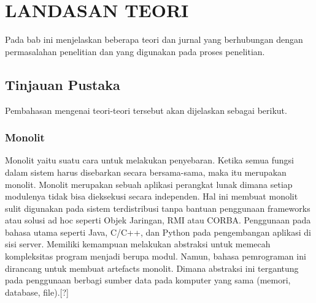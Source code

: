 \chapter{LANDASAN TEORI}
\vspace{4.5pt}
Pada bab ini menjelaskan beberapa teori dan jurnal yang berhubungan dengan permasalahan penelitian dan yang digunakan pada proses penelitian.
\section{Tinjauan Pustaka}
Pembahasan mengenai teori-teori tersebut akan dijelaskan sebagai berikut.
\subsection{Monolit}
Monolit yaitu suatu cara untuk melakukan penyebaran. Ketika semua fungsi dalam sistem harus disebarkan secara bersama-sama, maka itu merupakan monolit.\cite{6} Monolit merupakan sebuah aplikasi perangkat lunak dimana setiap modulenya tidak bisa dieksekusi secara independen. Hal ini membuat monolit sulit digunakan pada sistem terdistribusi tanpa bantuan penggunaan frameworks atau solusi ad hoc seperti Objek Jaringan, RMI atau CORBA.
Penggunaan pada bahasa utama seperti Java, C/C++, dan Python pada pengembangan aplikasi di sisi server. Memiliki kemampuan melakukan abstraksi untuk memecah kompleksitas program menjadi berupa modul. Namun, bahasa pemrograman ini dirancang untuk membuat artefacts monolit. Dimana abstraksi ini tergantung pada penggunaan berbagi sumber data pada komputer yang sama (memori, database, file).[?] 


